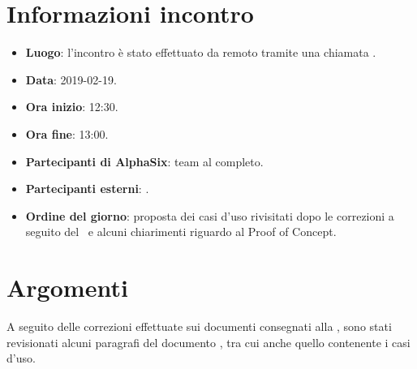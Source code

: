 \newcommand{\documento}{\VE}
\newcommand{\nomedocumentofisico}{VE\_2019-02-19.pdf}
\newcommand{\redazione}{\TG}
\newcommand{\verifica}{\CV}
\newcommand{\approvazione}{\SG}
\newcommand{\versione}{1.0.0}
\newcommand{\uso}{Esterno}
\newcommand{\destinateTo}{\TV, \\ & \RC, \\ & \II}
\newcommand{\datacreazione}{19 febbraio 2019}
\newcommand{\datamodifica}{21 febbraio 2019}
\newcommand{\stato}{Approvato}

\def\TABELLE{false}	%
\def\FIGURE{false} 	%






    

    
    
    \section{Informazioni incontro}
    	\begin{itemize}
    		\item \textbf{Luogo}: l'incontro è stato effettuato da remoto tramite una chiamata .
    		\item \textbf{Data}: 2019-02-19.
    		\item \textbf{Ora inizio}: 12:30.
    		\item \textbf{Ora fine}: 13:00.
    		\item \textbf{Partecipanti di AlphaSix}: team al completo.
    		\item \textbf{Partecipanti esterni}: \RC.
    		\item \textbf{Ordine del giorno}: proposta dei casi d'uso rivisitati dopo le correzioni a seguito del \RR~e alcuni chiarimenti riguardo al Proof of Concept.
    		
    	\end{itemize}
    
    \section{Argomenti}
    	A seguito delle correzioni effettuate sui documenti consegnati alla \RR, sono stati revisionati alcuni paragrafi del documento , tra cui anche quello contenente i casi d'uso.
    	

